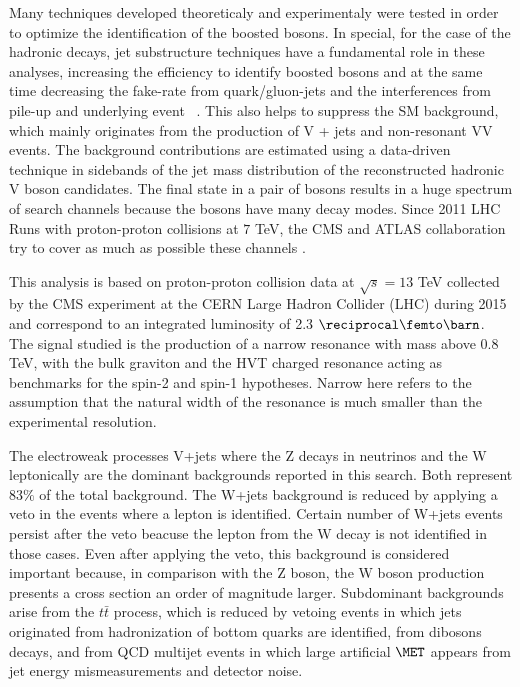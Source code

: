 Many techniques developed theoreticaly and experimentaly were tested in order to
optimize the identification of the boosted bosons.
In special, for the case of the hadronic decays,
jet substructure techniques\cite{Ellis:2007ib,Thaler:2011gf,Chatrchyan:2013vbb} have a fundamental role in these analyses,
increasing the efficiency to identify boosted bosons and at the same
time decreasing the fake-rate from quark/gluon-jets and the interferences from
pile-up and underlying event ~\cite{Ellis:2009su,Ellis:2009me,Krohn:2009th,
Butterworth:2008iy,Thaler:2010tr,Butterworth:2002tt,
Aad:2012meb,Almeida:2008yp,Ellis:2012sn,Larkoski:2013eya,Krohn:2012fg}.
This also helps to suppress the SM background, which mainly originates from the production of V + jets and non-resonant VV events. The background contributions are estimated using a data-driven technique in sidebands of the jet mass distribution of the reconstructed hadronic V boson candidates. The final
state in a pair of bosons results in a huge spectrum
of search channels because the bosons have many decay modes.
Since 2011 LHC Runs with proton-proton collisions at $7$ TeV, the CMS and ATLAS collaboration
try to cover as much as possible these channels \cite{Aad:2014xka,Aad:2015owa,Aad:2015ipg,Chatrchyan:2012baa,Chatrchyan:2012rva,Chatrchyan:2012ypy,Khachatryan:2014hpa,Khachatryan:2014gha,CMS:2015gla,Khachatryan:2015bma}.

This analysis is based on proton-proton collision data at $\sqrt{s} = 13$ TeV collected by the CMS experiment at the CERN Large Hadron Collider (LHC) during 2015 and correspond to an integrated luminosity of 2.3 $\fbinv$. The signal studied is the production of a narrow resonance with mass above 0.8 TeV, with the bulk graviton and the HVT charged resonance acting as benchmarks for the spin-2 and spin-1 hypotheses. Narrow  here refers to the assumption that the natural width of the resonance is much smaller than the experimental resolution.

\par The electroweak processes V+jets where the Z decays in neutrinos and the W leptonically are the dominant backgrounds reported in this search. Both represent 83$\%$ of the total background. The W+jets background is reduced by applying a veto in the events where a lepton is identified. Certain number of W+jets events persist after the veto beacuse the lepton from the W decay is not identified in those cases. Even after applying the veto, this background is considered important because, in comparison with the Z boson, the W boson production presents a cross section an order of magnitude larger. Subdominant backgrounds arise from the $t\bar{t}$ process, which is reduced by vetoing events in which jets originated from hadronization of bottom quarks are identified, from dibosons decays, and from QCD multijet events in which large artificial $\MET$ appears from jet energy mismeasurements and detector noise.

